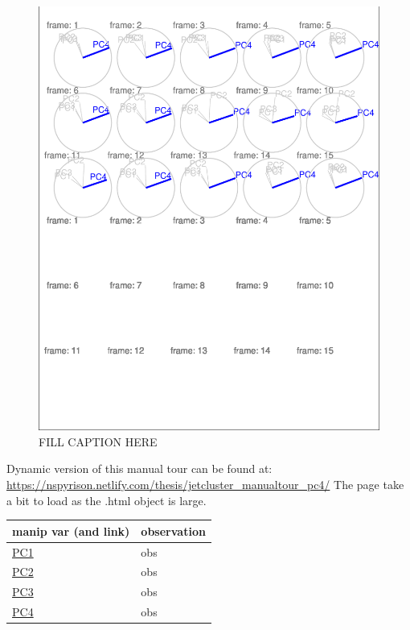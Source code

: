 \documentclass{monashthesis}
\begin{document}
\begin{figure}
\centering
\includegraphics{thesis_files/figure-latex/JetClusterBad-1.pdf}
\caption{\label{fig:JetClusterBad}FILL CAPTION HERE}
\end{figure}

Dynamic version of this manual tour can be found at:
\url{https://nspyrison.netlify.com/thesis/jetcluster_manualtour_pc4/}
The page take a bit to load as the .html object is large.

\begin{longtable}[]{@{}ll@{}}
\toprule
manip var (and link) & observation\tabularnewline
\midrule
\endhead
\href{https://nspyrison.netlify.com/thesis/jetcluster_manualtour_pc1/}{PC1}
& obs\tabularnewline
\href{https://nspyrison.netlify.com/thesis/jetcluster_manualtour_pc2/}{PC2}
& obs\tabularnewline
\href{https://nspyrison.netlify.com/thesis/jetcluster_manualtour_pc3/}{PC3}
& obs\tabularnewline
\href{https://nspyrison.netlify.com/thesis/jetcluster_manualtour_pc4/}{PC4}
& obs\tabularnewline
\bottomrule
\end{longtable}
\end{document}
